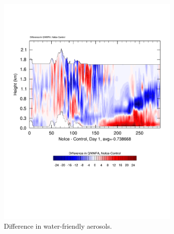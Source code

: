 \begin{figure}[ht]
\centering
	\begin{subfigure}{0.48\textwidth}
		\includegraphics[width=\textwidth]{results/noice/diffSec_QNWFA_NoIce_Day1.pdf}
		\caption{Difference in water-friendly aerosols.}
		\label{subfig:aerocrossQNWFA}
	\end{subfigure}
	\quad
		\begin{subfigure}{0.48\textwidth}

\end{subfigure}
\end{figure}
